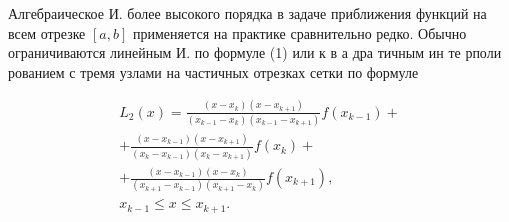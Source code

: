 \documentclass[10pt]{article}
\begin{document}
Алгебраическое И. более высокого порядка в задаче приближения функций на всем отрезке $[a, b]$ применяется на практике сравнительно редко. Обычно ограничиваются линейным И. по формуле (1) или к в а дра тичным ин те рполи рованием с тремя узлами на частичных отрезках сетки по формуле



\[

\begin{gathered}

L_{2}(x)=\frac{\left(x-x_{k}\right)\left(x-x_{k+1}\right)}{\left(x_{k-1}-x_{k}\right)\left(x_{k-1}-x_{k+1}\right)} f\left(x_{k-1}\right)+ \\

+\frac{\left(x-x_{k-1}\right)\left(x-x_{k+1}\right)}{\left(x_{k}-x_{k-1}\right)\left(x_{k}-x_{k+1}\right)} f\left(x_{k}\right)+ \\

+\frac{\left(x-x_{k-1}\right)\left(x-x_{k}\right)}{\left(x_{k+1}-x_{k-1}\right)\left(x_{k+1}-x_{k}\right)} f\left(x_{k+1}\right), \\

x_{k-1} \leqslant x \leqslant x_{k+1} .

\end{gathered}

\]
\end{document}
